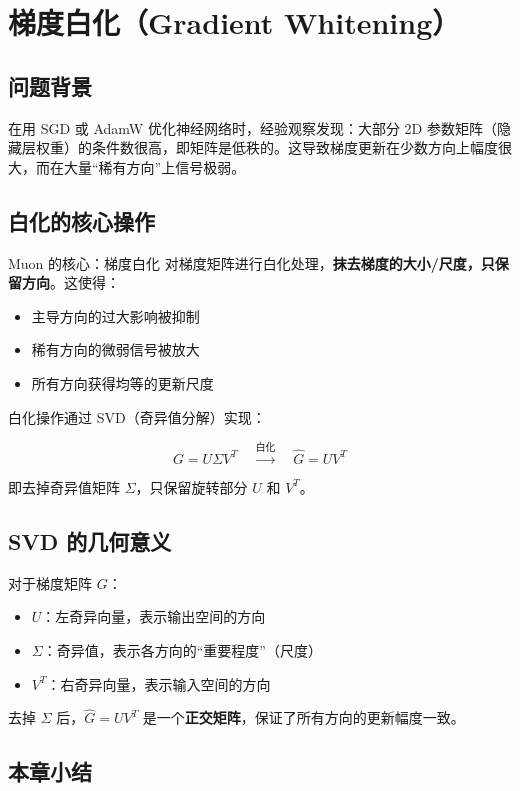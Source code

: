 \documentclass[a4paper]{article}
\begin{document}
\section{梯度白化（Gradient Whitening）}

\subsection{问题背景}

在用 SGD 或 AdamW 优化神经网络时，经验观察发现：大部分 2D 参数矩阵（隐藏层权重）的条件数很高，即矩阵是低秩的。这导致梯度更新在少数方向上幅度很大，而在大量``稀有方向''上信号极弱。

\subsection{白化的核心操作}

\begin{importantbox}{Muon 的核心：梯度白化}
对梯度矩阵进行白化处理，\textbf{抹去梯度的大小/尺度，只保留方向}。这使得：
\begin{itemize}
  \item 主导方向的过大影响被抑制
  \item 稀有方向的微弱信号被放大
  \item 所有方向获得均等的更新尺度
\end{itemize}
\end{importantbox}

白化操作通过 SVD（奇异值分解）实现：

$$
G = U \Sigma V^T \quad \xrightarrow{\text{白化}} \quad \hat{G} = U V^T
$$

即去掉奇异值矩阵 $\Sigma$，只保留旋转部分 $U$ 和 $V^T$。

\subsection{SVD 的几何意义}

对于梯度矩阵 $G$：
\begin{itemize}
  \item $U$：左奇异向量，表示输出空间的方向
  \item $\Sigma$：奇异值，表示各方向的``重要程度''（尺度）
  \item $V^T$：右奇异向量，表示输入空间的方向
\end{itemize}

去掉 $\Sigma$ 后，$\hat{G} = UV^T$ 是一个\textbf{正交矩阵}，保证了所有方向的更新幅度一致。

\subsection{本章小结}
\end{document}
